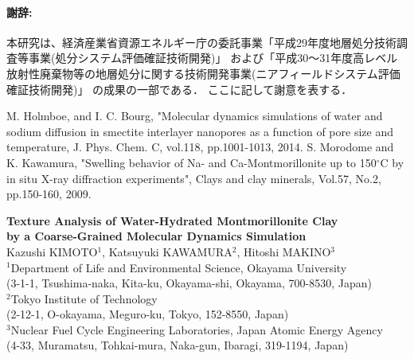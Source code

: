 ﻿\documentclass[11pt,a4j]{jarticle}
\begin{document}
\paragraph{謝辞:}本研究は、経済産業省資源エネルギー庁の委託事業「平成29年度地層処分技術調査等事業(処分システム評価確証技術開発)」
および「平成30～31年度高レベル放射性廃棄物等の地層処分に関する技術開発事業(ニアフィールドシステム評価確証技術開発)」
の成果の一部である．
ここに記して謝意を表する．
\vspace{-5mm}
\begin{thebibliography}{99}
M. Holmboe, and I. C. Bourg, "Molecular dynamics simulations of water and
sodium diffusion in smectite interlayer nanopores as a function of pore size
and temperature, J. Phys. Chem. C, vol.118, pp.1001-1013, 2014.
	S. Morodome and K. Kawamura, "Swelling behavior of Na- and Ca-Montmorillonite
	up to 150$^\circ$C by in situ X-ray diffraction experiments", 
	Clays and clay minerals, Vol.57, No.2, pp.150-160, 2009.
\end{thebibliography}
\clearpage
\begin{center}
{\large \bf
Texture Analysis of Water-Hydrated Montmorillonite Clay\\ 
by a Coarse-Grained Molecular Dynamics Simulation
}
\\ \vspace{5mm}
Kazushi KIMOTO$^1$, Katsuyuki KAWAMURA$^2$, Hitoshi MAKINO$^3$\\
\vspace{5mm}
$^1$Department of Life and Environmental Science, Okayama University\\
(3-1-1, Tsushima-naka, Kita-ku, Okayama-shi, Okayama, 700-8530, Japan)
\\
$^2$Tokyo Institute of Technology\\ (2-12-1, O-okayama, Meguro-ku, Tokyo, 152-8550, Japan)\\
$^3$Nuclear Fuel Cycle Engineering Laboratories, Japan Atomic Energy Agency\\
(4-33, Muramatsu, Tohkai-mura, Naka-gun, Ibaragi, 319-1194, Japan)
\end{center}
\end{document}
